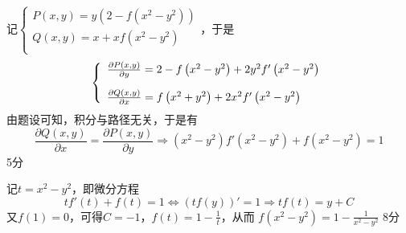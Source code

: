 \documentclass[hideanswer=false,
	enfont=newtxtext,
	zhfont=empty,
	mathfont=newtxmath,
]{cmcthesis}
\begin{document}
	\begin{answer}
	\begin{solution}
记$\left\{\begin{array}{l}
P\left(x,y\right)=y\left(2-f\left(x^2-y^2\right)\right)\\
Q\left(x,y\right)=x+xf\left(x^2-y^2\right)\\
\end{array}\right. $，于是
	\[
	\left\{\begin{array}{l}
	\vspace{1em}
	\frac{\partial P\left(x,y\right)}{\partial y}=2-f\left(x^2-y^2\right)+2y^2f'\left(x^2-y^2\right)\\
	\frac{\partial Q\left(x,y\right)}{\partial x}=f\left(x^2+y^2\right)+2x^2f'\left(x^2-y^2\right)\\
	\end{array}\right. 
	\]
由题设可知，积分与路径无关，于是有
	\[
	\frac{\partial Q\left(x,y\right)}{\partial x}=\frac{\partial P\left(x,y\right)}{\partial y}\Longrightarrow\left(x^2-y^2\right)f'\left(x^2-y^2\right)+f\left(x^2-y^2\right)=1
	\]
\hfill\dotfill 5分

记$t=x^2-y^2$，即微分方程
	\[
	tf'\left(t\right)+f\left(t\right)=1\Leftrightarrow\left(tf\left(y\right)\right)'=1\Rightarrow tf\left(t\right)=y+C
	\]
又$f(1)=0$，可得$C=-1\textbf{，}f(t)=1-\frac{1}{t}$，从而
$f\left(x^2-y^2\right)=1-\frac{1}{x^2-y^2}
$
\hfill\dotfill 8分
\end{solution}
\end{answer}
\end{document}
